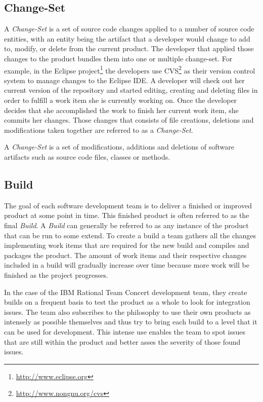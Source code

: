 \subsection{Change-Set}
A \emph{Change-Set} is a set of source code changes applied to a number of source code entities, with an entity being the artifact that a developer would change to add to, modify, or delete from the current product. 
The developer that applied those changes to the product bundles them into one or multiple change-set.
For example, in the Eclipse project\footnote{\url{http://www.eclipse.org}} the developers use CVS\footnote{\url{http://www.nongnu.org/cvs}} as their version control system to manage changes to the Eclipse IDE.
A developer will check out her current version of the repository and started editing, creating and deleting files in order to fulfill a work item she is currently working on.
Once the developer decides that she accomplished the work to finish her current work item, she commits her changes.
Those changes that consists of file creations, deletions and modifications taken together are referred to as a \emph{Change-Set}. 

\begin{note}
\begin{mydef}
A \emph{Change-Set} is a set of modifications, additions and deletions of software artifacts such as source code files, classes or methods.
\end{mydef}
\end{note}

\subsection{Build}
The goal of each software development team is to deliver a finished or improved product at some point in time.
This finished product is often referred to as the final \emph{Build}.
A \emph{Build} can generally be referred to as any instance of the product that can be run to some extend.
To create a build a team gathers all the changes implementing work items that are required for the new build and compiles and packages the product.
The amount of work items and their respective changes included in a build will gradually increase over time because more work will be finished as the project progresses.

In the case of the IBM Rational Team Concert development team, they create builds on a frequent basis to test the product as a whole to look for integration issues. 
The team also subscribes to the philosophy to use their own products as intensely as possible themselves and thus try to bring each build to a level that it can be used for development.
This intense use enables the team to spot issues that are still within the product and better asses the severity of those found issues.

